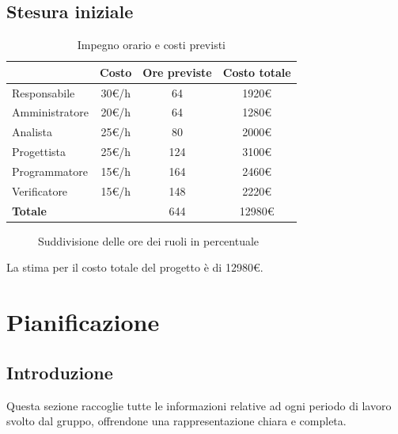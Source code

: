 \documentclass[a4paper,12pt]{article}
\begin{document}
    \subsection{Stesura iniziale}
        \begin{table}[H]
        \centering
        \label{tab:costi1}
        \begin{tabular}{|l|c|c|c|}
        \hline
            \rowcolor{lightgray}{\textbf{Ruolo}} & {\textbf{Costo}} & {\textbf{Ore previste}} & {\textbf{Costo totale}} \\
        \hline
            Responsabile & 30\euro{}/h & 64 & 1920\euro{} \\
        \hline
            Amministratore & 20\euro{}/h & 64 & 1280\euro{} \\
        \hline
            Analista & 25\euro{}/h & 80 & 2000\euro{} \\
        \hline
            Progettista & 25\euro{}/h & 124 & 3100\euro{} \\
        \hline
            Programmatore & 15\euro{}/h & 164 & 2460\euro{} \\
        \hline
            Verificatore & 15\euro{}/h & 148 & 2220\euro{} \\
        \hline
            \textbf{Totale} & & 644 & 12980\euro{} \\
        \hline
        \end{tabular}
        \caption{Impegno orario e costi previsti}
        \end{table}

        \begin{figure}[H]
            \centering
            \label{fig:costi1}
            \caption{Suddivisione delle ore dei ruoli in percentuale}
        \end{figure}

    La stima per il costo totale del progetto è di 12980\euro{}.

\newpage
\section{Pianificazione}
\label{sec:pianificazione}
    \subsection{Introduzione}
    Questa sezione raccoglie tutte le informazioni relative ad ogni periodo di lavoro svolto dal gruppo, offrendone una rappresentazione chiara e completa.
\end{document}
